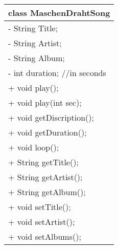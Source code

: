 \documentclass{scrartcl}
\begin{document}
\begin{tabular}{|p{}|}
\hline
	class MaschenDrahtSong\\
\hline
	- String Title;\\
	- String Artist;\\
	- String Album;\\
	- int duration; //in seconds\\
\hline
	+ void play();\\
	+ void play(int sec);\\
	+ void getDiscription();\\
	+ void getDuration();\\
	+ void loop();\\
	+ String getTitle();\\
	+ String getArtist();\\
	+ String getAlbum();\\
	+ void setTitle();\\
	+ void setArtist();\\
	+ void setAlbums();\\
\hline
\end{tabular}

\end{document}
